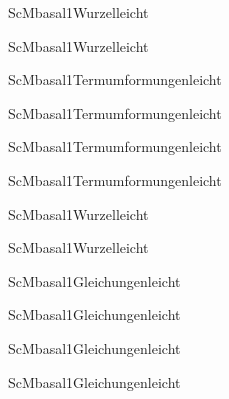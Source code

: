 \documentclass[12pt]{article}
\begin{document}
\begin{Add}{ScM}{basal1}{Wurzel}{leicht}
\solution{ }
\end{Add}
\begin{Add}{ScM}{basal1}{Wurzel}{leicht}
\end{Add}

\begin{Add}{ScM}{basal1}{Termumformungen}{leicht}
\solution{ }
\end{Add}
\begin{Add}{ScM}{basal1}{Termumformungen}{leicht}
\end{Add}

\begin{Add}{ScM}{basal1}{Termumformungen}{leicht}
\solution{ }
\end{Add}
\begin{Add}{ScM}{basal1}{Termumformungen}{leicht}
\end{Add}

\begin{Add}{ScM}{basal1}{Wurzel}{leicht}
\solution{ }
\end{Add}
\begin{Add}{ScM}{basal1}{Wurzel}{leicht}
\end{Add}

\begin{Add}{ScM}{basal1}{Gleichungen}{leicht}
\solution{ }
\end{Add}
\begin{Add}{ScM}{basal1}{Gleichungen}{leicht}
\end{Add}

\begin{Add}{ScM}{basal1}{Gleichungen}{leicht}
\solution{ }
\end{Add}
\begin{Add}{ScM}{basal1}{Gleichungen}{leicht}
\end{Add}
\end{document}
